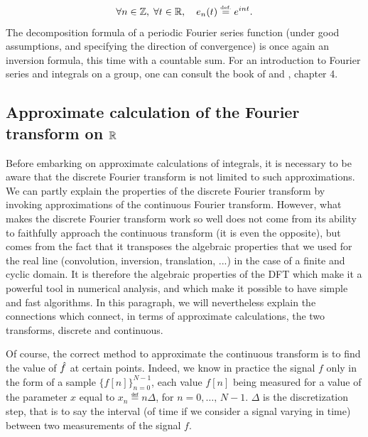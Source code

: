 \begin{equation*}
\forall n \in \mathbb{Z}, \; \forall t \in \mathbb{R}, \quad e_n (t) \stackrel{\mbox{\upshape\tiny def.}}{=} e^{int}.
\end{equation*}
The decomposition formula of a periodic Fourier series function (under good assumptions, and specifying the direction of convergence) is once again an inversion formula, this time with a countable sum. For an introduction to Fourier series and integrals on a group, one can consult the book of  and  \cite{dym}, chapter 4.
\subsection{Approximate calculation of the Fourier transform on $ \mathbb{R} $}
\label{sect2-calculus-trans-fourier-approach} 
 
 
  Before embarking on approximate calculations of integrals, it is necessary to be aware that the discrete Fourier transform is not limited to such approximations. We can partly explain the  properties of the discrete Fourier transform by invoking approximations of the continuous Fourier transform. However, what makes the discrete Fourier transform work so well does not come from its ability to faithfully approach the continuous transform (it is even the opposite), but comes from the fact that it transposes the algebraic properties that we used for the real line (convolution, inversion, translation, ...) in the case of a finite and cyclic domain. It is therefore the algebraic properties of the DFT which make it a powerful tool in numerical analysis, and which make it possible to have simple and fast algorithms. In this paragraph, we will nevertheless explain the connections which connect, in terms of approximate calculations, the two transforms, discrete and continuous.
 
 
 Of course, the correct method to approximate the continuous transform is to find the value of $ \hat{f} $ at certain points. Indeed, we know in practice the signal $ f $ only in the form of a sample $ \{f [n] \}_{n = 0}^{N-1} $, each value $ f [n ] $ being measured for a value of the parameter $ x $ equal to $ x_n \eqdef n \Delta $, for $ n = 0, \ldots, \, N-1 $. $ \Delta $ is the discretization step, that is to say the interval (of time if we consider a signal varying in time) between two measurements of the signal $ f $.
 
